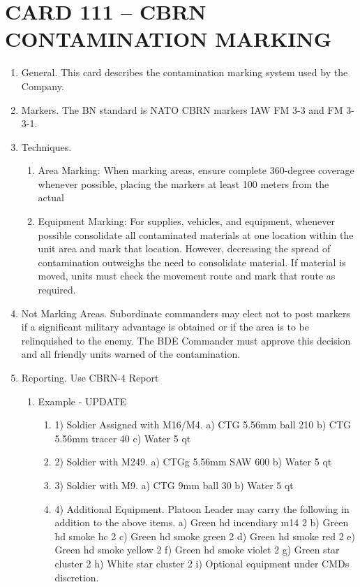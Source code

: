 \documentclass{article}
\begin{document}
\newpage
\section*{CARD 111 – CBRN CONTAMINATION MARKING}
\begin{enumerate}
    \item General.   This card describes the contamination marking system used by the Company.

\item Markers.  The BN standard is NATO CBRN markers IAW FM 3-3 and FM 3-3-1.

\item Techniques.  
\begin{enumerate}
    \item Area Marking: When marking areas, ensure complete 360-degree coverage whenever possible, placing the markers at least 100 meters from the actual \item Equipment Marking: For supplies, vehicles, and equipment, whenever possible consolidate all contaminated materials at one location within the unit area and mark that location. However, decreasing the spread of contamination outweighs the need to consolidate material. If material is moved, units must check the movement route and mark that route as required.
\end{enumerate}
\item Not Marking Areas.   Subordinate commanders may elect not to post markers if a significant military advantage is obtained or if the area is to be relinquished to the enemy.  The BDE Commander must approve this decision and all friendly units warned of the contamination.
\item Reporting.  Use CBRN-4 Report
\begin{enumerate}
    \item Example - UPDATE
    \begin{enumerate}
        \item 
1)	Soldier Assigned with M16/M4.
a)	CTG 5.56mm ball			210
b)	CTG 5.56mm tracer			40
c)	Water 					5 qt

\item
2)	Soldier with M249.
a)	CTGg 5.56mm SAW			600
b)	Water					5 qt
\item
3)	Soldier with M9.
a)	CTG 9mm ball			30
b)	Water 					5 qt
\item
4)	Additional Equipment.   Platoon Leader may carry the following in addition to the above items.
a)	Green hd incendiary m14	  	2
b)	Green hd smoke hc			2
c)	Green hd smoke green     		2
d)	Green hd smoke red			2
e)	Green hd smoke yellow		2
f)	Green hd smoke violet		2
g)	Green star cluster			2
h)	White star cluster			2
i)	Optional equipment under CMDs discretion. 
\end{enumerate}
\end{enumerate}
\end{enumerate}
\end{document}

